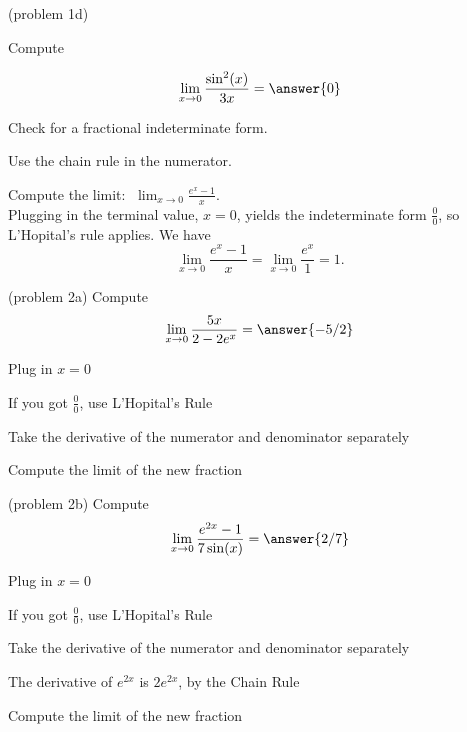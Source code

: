 \documentclass{ximera}
\begin{document}
\begin{problem}(problem 1d)

Compute

        \[  \lim_{x \to 0} \frac{\sin^2(x)}{3x} = \answer{0} \]
  
   \begin{hint}   Check for a fractional indeterminate form.  \end{hint}
    
   \begin{hint}   Use the chain rule in the numerator.        \end{hint}
		
\end{problem}



\begin{example}[example 2]
 Compute the limit:  $\displaystyle{\;\lim_{x \to 0} \frac{e^x - 1}{x}}.$\\
Plugging in the terminal value, $x=0$, yields 
the indeterminate form $\frac00$, so L'Hopital's rule applies.
We have 
\[\lim_{x \to 0} \frac{e^x - 1}{x} = \lim_{x \to 0} \frac{e^x}{1} = 1.\]
\end{example}


\begin{problem}(problem 2a)
  Compute
  \[
  \lim_{x \to 0} \frac{5x}{2 - 2e^x} = \answer{-5/2}
  \]
  
    \begin{hint}
      Plug in $x=0$
    \end{hint}
    \begin{hint}
      If you got $\frac00$, use L'Hopital's Rule
    \end{hint}
    \begin{hint}
      Take the derivative of the numerator and denominator separately
    \end{hint}
	  \begin{hint}
      Compute the limit of the new fraction
    \end{hint}
	
\end{problem}


\begin{problem}(problem 2b)
  Compute
  \[
  \lim_{x \to 0} \frac{e^{2x} -1}{7\sin(x)} = \answer{2/7}
  \]
  
    \begin{hint}
      Plug in $x=0$
    \end{hint}
    \begin{hint}
      If you got $\frac00$, use L'Hopital's Rule
    \end{hint}
    \begin{hint}
      Take the derivative of the numerator and denominator separately
    \end{hint}
		\begin{hint}
		 The derivative of $e^{2x}$ is $2e^{2x}$, by the Chain Rule
	  \end{hint}
		\begin{hint}
      Compute the limit of the new fraction
    \end{hint}
    
\end{problem}
\end{document}

